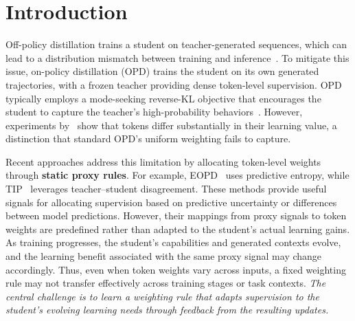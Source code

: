 \documentclass{article}
\theoremstyle{plain}
\theoremstyle{definition}
\theoremstyle{remark}
\begin{document}

% 



\section{Introduction}

Off-policy distillation trains a student on teacher-generated sequences, which can lead to a distribution mismatch between training and inference~\citep{lin2020autoregressive,agarwal2024policy}. To mitigate this issue, on-policy distillation (OPD) trains the student on its own generated trajectories, with a frozen teacher providing dense token-level supervision. OPD typically employs a mode-seeking reverse-KL objective that encourages the student to capture the teacher’s high-probability behaviors~\citep{wen2023f,gu2024minillm}. However, experiments by~\citep{li2026rethinking} show that tokens differ substantially in their learning value, a distinction that standard OPD’s uniform weighting fails to capture.

Recent approaches address this limitation by allocating token-level weights through \textbf{static proxy rules}. For example, EOPD~\citep{jin2026entropy} uses predictive entropy, while TIP~\citep{xu2026tip} leverages teacher--student disagreement. These methods provide useful signals for allocating supervision based on predictive uncertainty or differences between model predictions. However, their mappings from proxy signals to token weights are predefined rather than adapted to the student's actual learning gains. As training progresses, the student's capabilities and generated contexts evolve, and the learning benefit associated with the same proxy signal may change accordingly. Thus, even when token weights vary across inputs, a fixed weighting rule may not transfer effectively across training stages or task contexts. \textit{The central challenge is to learn a weighting rule that adapts supervision to the student's evolving learning needs through feedback from the resulting updates.}
\end{document}

